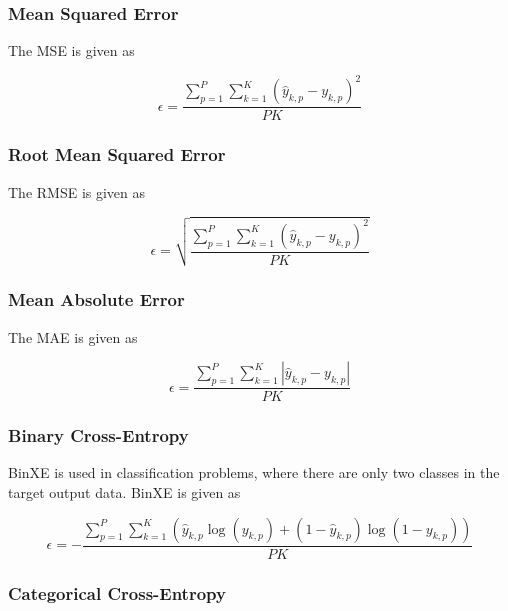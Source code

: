 \subsubsection{Mean Squared Error}\label{sec:anns:training:error_functions:mse}

The \acs{MSE} is given as

\begin{equation}
      \epsilon = \frac{\sum_{p=1}^P \sum_{k=1}^K (\hat{y}_{k,p} - y_{k,p})^2}{PK}
      \label{eq:mse}
\end{equation}


\subsubsection{Root Mean Squared Error}\label{sec:anns:training:error_functions:rmse}

The \acs{RMSE} is given as

\begin{equation}
      \epsilon = \sqrt{\frac{\sum_{p=1}^P \sum_{k=1}^K (\hat{y}_{k,p} - y_{k,p})^2}{PK}}
      \label{eq:rmse}
\end{equation}


\subsubsection{Mean Absolute Error}\label{sec:anns:training:error_functions:mae}

The \acs{MAE} is given as

\begin{equation}
      \epsilon = \frac{\sum_{p=1}^P \sum_{k=1}^K |\hat{y}_{k,p} - y_{k,p}|}{PK}
      \label{eq:mae}
\end{equation}


\subsubsection{Binary Cross-Entropy}\label{sec:anns:training:error_functions:bin_xe}

\acs{BinXE} is used in classification problems, where there are only two classes in the target output data. \acs{BinXE} is given as

\begin{equation}
      \epsilon = -\frac{\sum_{p=1}^P \sum_{k=1}^K (\hat{y}_{k,p} \log{(y_{k,p})} + (1 - \hat{y}_{k,p})\log{(1 - y_{k,p})})}{PK}
      \label{eq:bin_xe}
\end{equation}


\subsubsection{Categorical Cross-Entropy}\label{sec:anns:training:error_functions:cat_xe}


